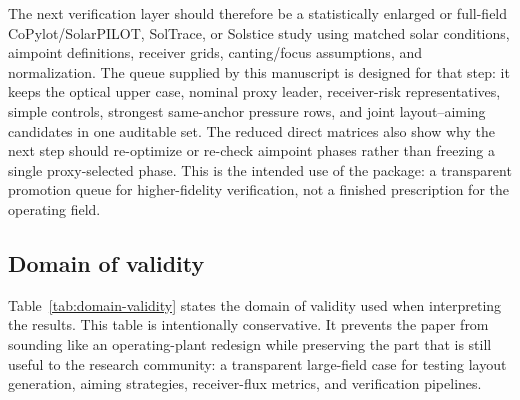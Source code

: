\documentclass[final,3p,times]{elsarticle}
\begin{document}
The next verification layer should therefore be a statistically enlarged or full-field CoPylot/SolarPILOT, SolTrace, or Solstice study using matched solar conditions, aimpoint definitions, receiver grids, canting/focus assumptions, and normalization. The queue supplied by this manuscript is designed for that step: it keeps the optical upper case, nominal proxy leader, receiver-risk representatives, simple controls, strongest same-anchor pressure rows, and joint layout--aiming candidates in one auditable set. The reduced direct matrices also show why the next step should re-optimize or re-check aimpoint phases rather than freezing a single proxy-selected phase. This is the intended use of the package: a transparent promotion queue for higher-fidelity verification, not a finished prescription for the operating field.

\subsection{Domain of validity}
Table~\ref{tab:domain-validity} states the domain of validity used when interpreting the results. This table is intentionally conservative. It prevents the paper from sounding like an operating-plant redesign while preserving the part that is still useful to the research community: a transparent large-field case for testing layout generation, aiming strategies, receiver-flux metrics, and verification pipelines.
\end{document}
